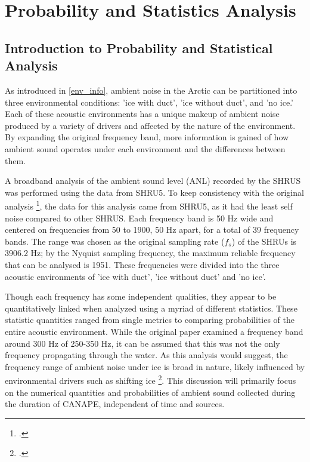 
\chapter{Probability and Statistics Analysis} \label{sec_probsnstat}

\section{Introduction to Probability and Statistical Analysis} \label{sec_statintro}


As introduced in \autoref{env_info}, ambient noise in the Arctic can be partitioned into three environmental conditions: 'ice with duct', 'ice without duct', and 'no ice.' Each of these acoustic environments has a unique makeup of ambient noise produced by a variety of drivers and affected by the nature of the environment. By expanding the original frequency band, more information is gained of how ambient sound operates under each environment and the differences between them.  

 A broadband analysis of the ambient sound level (ANL) recorded by the SHRUS was performed using the data from SHRU5. To keep consistency with the original analysis \footcite[]{Bonnel2021}, the data for this analysis came from SHRU5, as it had the least self noise compared to other SHRUS. Each frequency band is 50 Hz wide and centered on frequencies from 50 to 1900, 50 Hz apart, for a total of 39 frequency bands. The range was chosen as the original sampling rate ($f_{s}$) of the SHRUs is  3906.2 Hz; by the Nyquist sampling frequency, the maximum reliable frequency that can be analysed is 1951.  These frequencies were divided into the three acoustic environments of 'ice with duct', 'ice without duct' and 'no ice'. %

Though each frequency has some independent qualities, they appear to be quantitatively linked when analyzed using a myriad of different statistics. These statistic quantities ranged from single metrics to comparing probabilities of the entire acoustic environment. While the original paper examined a frequency band around 300 Hz of 250-350 Hz, it can be assumed that this was not the only frequency propagating through the water. As this analysis would suggest, the frequency range of ambient noise under ice is broad in nature, likely influenced by environmental drivers such as shifting ice \footcite[]{ice_enviro}. This discussion will primarily focus on the numerical quantities and probabilities of ambient sound collected during the duration of CANAPE, independent of time and sources.

